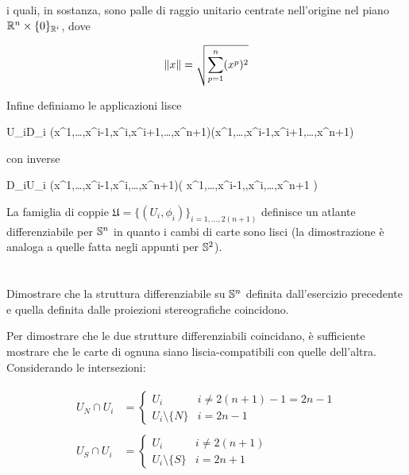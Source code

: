 i quali, in sostanza, sono palle di raggio unitario centrate nell'origine nel piano $ \R^{n} \times \{0\}_{\R^{i}} $, dove

\begin{equation}
	\norm{x} = \sqrt{ \sum_{p=1}^{n} (x^{p})^{2} }
\end{equation}

Infine definiamo le applicazioni lisce

%
	{U_{i}}{D_{i}}%
	{(x^{1},\dots,x^{i-1},x^{i},x^{i+1},\dots,x^{n+1})}{(x^{1},\dots,x^{i-1},x^{i+1},\dots,x^{n+1})}

con inverse

%
	{D_{i}}{U_{i}}%
	{(x^{1},\dots,x^{i-1},x^{i},\dots,x^{n+1})}{\left( x^{1},\dots,x^{i-1},,x^{i},\dots,x^{n+1} \right)}

La famiglia di coppie $ \mathfrak{U} = \{ (U_{i},\phi_{i}) \}_{i=1,\dots,2(n+1)} $ definisce un atlante differenziabile per $ \S^{n} $ in quanto i cambi di carte sono lisci (la dimostrazione è analoga a quelle fatta negli appunti per $ \S^{2} $).

\tocless\section{}\label{es2-2}

\begin{tcolorbox}
	Dimostrare che la struttura differenziabile su $ \S^{n} $ definita dall’esercizio precedente e quella definita dalle proiezioni
	stereografiche coincidono.
\end{tcolorbox}

Per dimostrare che le due strutture differenziabili coincidano, è sufficiente mostrare che le carte di ognuna siano liscia-compatibili con quelle dell'altra.\\
Considerando le intersezioni:

\begin{align}
	\begin{split}
		U_{N} \cap U_{i} &= %
		\begin{cases}
			U_{i} & i \neq 2(n+1)-1 = 2n-1\\
			U_{i} \setminus \{ N \} & i = 2n-1
		\end{cases}\\\\
		U_{S} \cap U_{i} &= %
		\begin{cases}
			U_{i} & i \neq 2(n+1)\\
			U_{i} \setminus \{ S \} & i = 2n+1
		\end{cases}
	\end{split}
\end{align}

